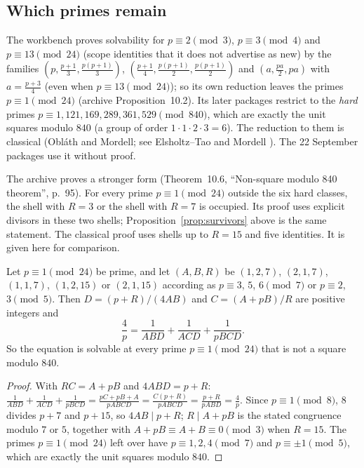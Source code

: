 \subsection{Which primes remain}

The workbench proves solvability for $p\equiv2\pmod 3$, $p\equiv3\pmod4$ and $p\equiv13\pmod{24}$ (scope identities that it does not advertise as new) by the families $(p,\frac{p+1}3,\frac{p(p+1)}3)$, $(\frac{p+1}4,\frac{p(p+1)}2,\frac{p(p+1)}2)$ and $(a,\frac{pa}2,pa)$ with $a=\frac{p+3}4$ (even when $p\equiv13\pmod{24}$); so its own reduction leaves the primes $p\equiv1\pmod{24}$ (archive Proposition~10.2). Its later packages restrict to the \emph{hard} primes $p\equiv1,121,169,289,361,529\pmod{840}$, which are exactly the unit squares modulo $840$ (a group of order $1\cdot1\cdot2\cdot3=6$). The reduction to them is classical (Obláth and Mordell; see Elsholtz--Tao \cite{ElsholtzTao} and Mordell \cite{Mordell}). The 22 September packages use it without proof.

The archive proves a stronger form (Theorem~10.6, ``Non-square modulo 840 theorem'', p.~95). For every prime $p\equiv1\pmod{24}$ outside the six hard classes, the shell with $R=3$ or the shell with $R=7$ is occupied. Its proof uses explicit divisors in these two shells; Proposition~\ref{prop:survivors} above is the same statement.
The classical proof uses shells up to $R=15$ and five identities. It is given here for comparison.

\begin{proposition}\label{prop:mod840}
Let $p\equiv1\pmod{24}$ be prime, and let $(A,B,R)$ be $(1,2,7)$, $(2,1,7)$, $(1,1,7)$, $(1,2,15)$ or $(2,1,15)$ according as $p\equiv3$, $5$, $6\pmod7$ or $p\equiv2$, $3\pmod5$. Then $D=(p+R)/(4AB)$ and $C=(A+pB)/R$ are positive integers and
\[
\frac4p=\frac1{ABD}+\frac1{ACD}+\frac1{pBCD}.
\]
So the equation is solvable at every prime $p\equiv1\pmod{24}$ that is not a square modulo $840$.
\end{proposition}
\begin{proof}
With $RC=A+pB$ and $4ABD=p+R$: $\frac1{ABD}+\frac1{ACD}+\frac1{pBCD}=\frac{pC+pB+A}{pABCD}=\frac{C(p+R)}{pABCD}=\frac{p+R}{pABD}=\frac4p$. Since $p\equiv1\pmod8$, $8$ divides $p+7$ and $p+15$, so $4AB\mid p+R$; $R\mid A+pB$ is the stated congruence modulo $7$ or $5$, together with $A+pB\equiv A+B\equiv0\pmod3$ when $R=15$. The primes $p\equiv1\pmod{24}$ left over have $p\equiv1,2,4\pmod7$ and $p\equiv\pm1\pmod5$, which are exactly the unit squares modulo $840$.
\end{proof}


